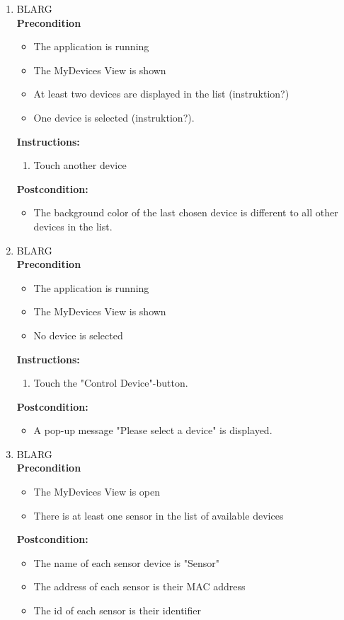 \documentclass[a4paper]{article}
\newlength{\testlabellength}
\newenvironment{testlist}{\begin{enumerate}[label=\bfseries Instruction \thesubsection.\arabic* , labelindent=0pt, labelwidth=\testlabellength , leftmargin=2cm]}{\end{enumerate}}
\newenvironment{precondition}{
{\color{white}BLARG}\\ 
\textbf{Precondition}
\begin{itemize}[labelindent=0cm, labelwidth=2cm , leftmargin=1cm]
}
{\end{itemize}}
\newenvironment{instruction}{
\textbf{Instructions:}
\begin{enumerate}[label=\bfseries  \arabic*., labelindent=0cm, labelwidth=2cm , leftmargin=1cm]
}
{\end{enumerate}}
\newenvironment{postcondition}{
\textbf{Postcondition:}
\begin{itemize}[labelindent=0cm, labelwidth=2cm , leftmargin=1cm]
}
{\end{itemize}}
\begin{document}
\begin{appendices}
\begin{testlist}
    \item 
   		\begin{precondition}
   			\item The application is running
   			\item The MyDevices View is shown
   			\item At least two devices are displayed in the list (instruktion?)
   			\item One device is selected (instruktion?).
   		\end{precondition}
   		\begin{instruction}
   			\item Touch another device
   		\end{instruction}
   		\begin{postcondition}
   			\item The background color of the last chosen device is different to all other devices in the list.
   		\end{postcondition}
    
    \item
    	\begin{precondition}
    		\item The application is running
    		\item The MyDevices View is shown
    		\item No device is selected
    	\end{precondition}
    	\begin{instruction}
    		\item Touch the "Control Device"-button.
    	\end{instruction}
    	\begin{postcondition}
    		\item A pop-up message "Please select a device" is displayed.
    	\end{postcondition}
   
	\item
		\begin{precondition}
			\item The MyDevices View is open
			\item There is at least one sensor in the list of available devices
		\end{precondition}
		\begin{postcondition}
			\item The name of each sensor device is "Sensor"
			\item The address of each sensor is their MAC address
			\item The id of each sensor is their identifier
		\end{postcondition}
		   

\end{testlist}
\end{appendices}
\end{document}
